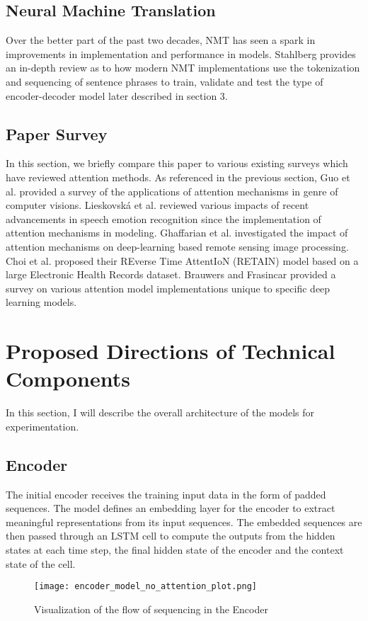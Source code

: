 \documentclass[conference]{IEEEtran}
\begin{document}
\subsection{Neural Machine Translation}
Over the better part of the past two decades, NMT has seen a spark in improvements in implementation and performance in models. Stahlberg \cite{b14} provides an in-depth review as to how modern NMT implementations use the tokenization and sequencing of sentence phrases to train, validate and test the type of encoder-decoder model later described in section $3$. 
\subsection{Paper Survey}
In this section, we briefly compare this paper to various existing surveys which have reviewed attention methods. As referenced in the previous section, Guo et al. \cite{b9} provided a survey of the applications of attention mechanisms in genre of computer visions. Lieskovská et al. \cite{b10} reviewed various impacts of recent advancements in speech emotion recognition since the implementation of attention mechanisms in modeling. Ghaffarian et al. \cite{b11} investigated the impact of attention mechanisms on deep-learning based remote sensing image processing. Choi et al. \cite{b12} proposed their REverse Time AttentIoN (RETAIN) model based on a large Electronic Health Records dataset. Brauwers and Frasincar \cite{b13} provided a survey on various attention model implementations unique to specific deep learning models.

\section{Proposed Directions of Technical Components}
In this section, I will describe the overall architecture of the models for experimentation. 
\subsection{Encoder}
The initial encoder receives the training input data in the form of padded sequences. The model defines an embedding layer for the encoder to extract meaningful representations from its input sequences. The embedded sequences are then passed through an LSTM cell to compute the outputs from the hidden states at each time step, the final hidden state of the encoder and the context state of the cell.
\begin{figure}[h]
\centering
\texttt{[image: encoder\_model\_no\_attention\_plot.png]}
\caption{Visualization of the flow of sequencing in the Encoder}
\end{figure}
\end{document}
